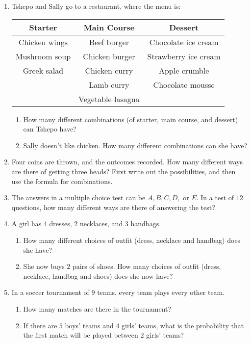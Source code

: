 \begin{eocexercises}{}
\begin{enumerate}
\item Tshepo and Sally go to a restaurant, where the menu is:\\
\begin{tabular}{|c|c|c|}
\hline
Starter & Main Course & Dessert \\
\hline
Chicken wings & Beef burger & Chocolate ice cream \\
Mushroom soup & Chicken burger &  Strawberry ice cream\\
Greek salad & Chicken curry &  Apple crumble\\
 & Lamb curry & Chocolate mousse\\
 & Vegetable lasagna & \\
\hline
\end{tabular}

\begin{enumerate}
\item How many different combinations (of starter, main course, and dessert) can Tshepo have?
\item Sally doesn't like chicken.  How many different combinations can she have?
\end{enumerate}

\item Four coins are thrown, and the outcomes recorded. How many different ways are there of getting three heads? First write out the possibilities, and then use the formula for combinations.

\item The answers in a multiple choice test can be $A, B, C, D,$ or $E$. In a test of $12$ questions, how many different ways are there of answering the test?

\item A girl has $4$ dresses, $2$ necklaces, and $3$ handbags. 
\begin{enumerate} \item How many different choices of outfit (dress, necklace and handbag) does she have?
\item She now buys $2$ pairs of shoes. How many choices of outfit (dress, necklace, handbag and shoes) does she now have?
\end{enumerate}

\item In a soccer tournament of $9$ teams, every team plays every other team. 
\begin{enumerate}
\item How many matches are there in the tournament?
\item If there are $5$ boys' teams and $4$ girls' teams, what is the probability that the first match will be played between $2$ girls' teams?
\end{enumerate}


\end{enumerate}
\end{eocexercises}
